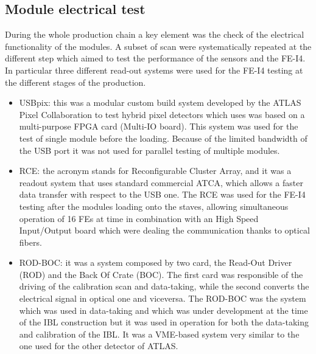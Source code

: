 \subsection{Module electrical test}
During the whole production chain a key element was the check of the electrical functionality of the modules. A subset of scan were systematically repeated at the different step which aimed to test the performance of the sensors and the FE-I4.\\
In particular three different read-out systems were used for the FE-I4 testing at the different stages of the production.
\begin{itemize}
\item USBpix: this was a modular custom build system developed by the ATLAS Pixel Collaboration to test hybrid pixel detectors which uses  was based on a multi-purpose FPGA card (Multi-IO board). This system was used for the test of single module before the loading. Because of the limited bandwidth of the USB port it was not used for parallel testing of multiple modules.
\item RCE: the acronym stands for Reconfigurable Cluster Array, and it was a readout system that uses standard commercial ATCA, which allows a faster data transfer with respect to the USB one. The RCE was used for the FE-I4 testing after the modules loading onto the staves, allowing simultaneous operation of 16 FEs at time in combination with an High Speed Input/Output board which were dealing the communication thanks to optical fibers.
\item ROD-BOC: it was a system composed by two card, the Read-Out Driver (ROD) and the Back Of Crate (BOC). The first card was responsible of the driving of the calibration scan and data-taking, while the second converts the electrical signal in optical one and viceversa. The ROD-BOC was the system which was used in data-taking and which was under development at the time of the IBL construction but it was used in operation for both the data-taking and calibration of the IBL. It was a VME-based system very similar to the one used for the other detector of ATLAS.
\end{itemize}

